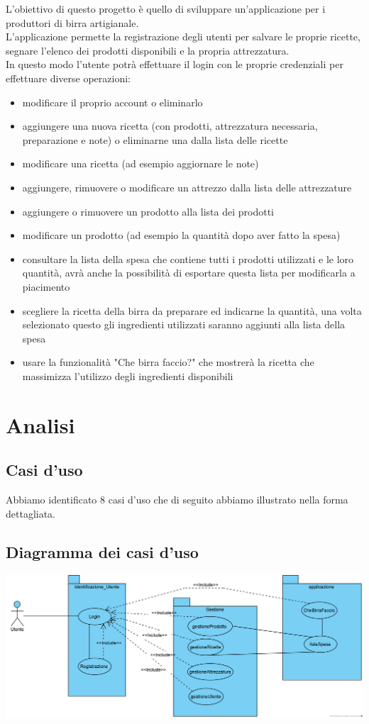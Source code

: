 \documentclass[a4paper, titlepage]{article}
\begin{document}
\newpage
L'obiettivo di questo progetto è quello di sviluppare un'applicazione per i produttori di birra artigianale.\\
L'applicazione permette la registrazione degli utenti per salvare le proprie ricette, segnare l'elenco dei prodotti disponibili e la propria attrezzatura.\\
In questo modo l'utente potrà effettuare il login con le proprie credenziali per effettuare diverse operazioni:
\begin{itemize}
    \item modificare il proprio account o eliminarlo
    \item aggiungere una nuova ricetta (con prodotti, attrezzatura necessaria, preparazione e note) o eliminarne una dalla lista delle ricette
    \item modificare una ricetta (ad esempio aggiornare le note)
    \item aggiungere, rimuovere o modificare un attrezzo dalla lista delle attrezzature
    \item aggiungere o rimuovere un prodotto alla lista dei prodotti
    \item modificare un prodotto (ad esempio la quantità dopo aver fatto la spesa)
    \item consultare la lista della spesa che contiene tutti i prodotti utilizzati e le loro quantità, avrà anche la possibilità di esportare questa lista per modificarla a piacimento
    \item scegliere la ricetta della birra da preparare ed indicarne la quantità, una volta selezionato questo gli ingredienti utilizzati saranno aggiunti alla lista della spesa
    \item usare la funzionalità "Che birra faccio?" che mostrerà la ricetta che massimizza l'utilizzo degli ingredienti disponibili
\end{itemize}

\newpage
\section{Analisi}
\subsection{Casi d'uso}
Abbiamo identificato 8 casi d'uso che di seguito abbiamo illustrato nella forma dettagliata.
\vphantom{}
\subsection{Diagramma dei casi d'uso}
\vphantom{}
\includegraphics[scale=0.65]{Immagini/Use Case Diagram_Brew Day!.png}
\vphantom{}
\end{document}
